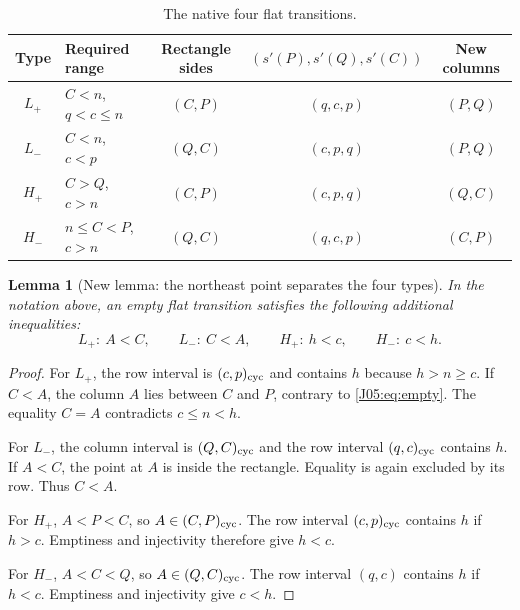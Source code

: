 \documentclass[11pt,oneside]{report}
\newtheorem{lemma}[theorem]{Lemma}
\theoremstyle{definition}
\numberwithin{equation}{section}
\newcommand{\Lp}{L_+}\newcommand{\Lm}{L_-}
\newcommand{\Hp}{H_+}\newcommand{\Hm}{H_-}
\begin{document}
\begin{table}[ht]
\centering\small
\begin{tabular}{c|l|c|c|c}
Type & Required range & Rectangle sides & $(s'(P),s'(Q),s'(C))$ & New columns\\\hline
$\Lp$ & $C<n$, $q<c\leq n$ & $(C,P)$ & $(q,c,p)$ & $(P,Q)$\\
$\Lm$ & $C<n$, $c<p$ & $(Q,C)$ & $(c,p,q)$ & $(P,Q)$\\
$\Hp$ & $C>Q$, $c>n$ & $(C,P)$ & $(c,p,q)$ & $(Q,C)$\\
$\Hm$ & $n\leq C<P$, $c>n$ & $(Q,C)$ & $(q,c,p)$ & $(C,P)$
\end{tabular}
\caption{The native four flat transitions.}\label{J05:tab:types}
\end{table}

\begin{lemma}[New lemma: the northeast point separates the four types]
\label{J05:lem:separate}
In the notation above, an empty flat transition satisfies the following
additional inequalities:
\[
 \Lp:\ A<C,\qquad
 \Lm:\ C<A,\qquad
 \Hp:\ h<c,\qquad
 \Hm:\ c<h.
\]
\end{lemma}
\begin{proof}
For $\Lp$, the row interval is $(c,p)_{\rm cyc}$ and contains $h$ because
$h>n\geq c$. If $C<A$, the column $A$ lies between $C$ and $P$, contrary to
\eqref{J05:eq:empty}. The equality $C=A$ contradicts $c\leq n<h$.

For $\Lm$, the column interval is $(Q,C)_{\rm cyc}$ and the row interval
$(q,c)_{\rm cyc}$ contains $h$. If $A<C$, the point at $A$ is inside the
rectangle. Equality is again excluded by its row. Thus $C<A$.

For $\Hp$, $A<P<C$, so $A\in(C,P)_{\rm cyc}$. The row interval
$(c,p)_{\rm cyc}$ contains $h$ if $h>c$. Emptiness and injectivity therefore
give $h<c$.

For $\Hm$, $A<C<Q$, so $A\in(Q,C)_{\rm cyc}$. The row interval $(q,c)$
contains $h$ if $h<c$. Emptiness and injectivity give $c<h$.
\end{proof}
\end{document}
